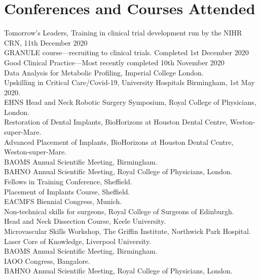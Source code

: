 \section*{Conferences and Courses Attended}

 Tomorrow's Leaders, Training in clinical trial development run by the NIHR CRN, 11th December 2020 \\ 
 GRANULE course---recruiting to clinical trials. Completed 1st December 2020 \\
 Good Clinical Practice---Most recently completed 10th November 2020 \\
 Data Analysis for Metabolic Profiling, Imperial College London. \\
 Upskilling in Critical Care/Covid-19, University Hospitals Birmingham, 1st May 2020. \\
 EHNS Head and Neck Robotic Surgery Symposium, Royal College of Physicians, London. \\
 Restoration of Dental Implants, BioHorizons at Houston Dental Centre,  Weston-super-Mare. \\
 Advanced Placement of Implants, BioHorizons at Houston Dental Centre,  Weston-super-Mare. \\
 BAOMS Annual Scientific Meeting, Birmingham. \\
 BAHNO Annual Scientific Meeting, Royal College of Physicians, London. \\
 Fellows in Training Conference,  Sheffield. \\
 Placement of Implants Course, Sheffield. \\
 EACMFS Biennial Congress, Munich. \\
 Non-technical skills for surgeons, Royal College of Surgeons of Edinburgh. \\
 Head and Neck Dissection Course, Keele University. \\
 Microvascular Skills Workshop, The Griffin Institute, Northwick Park Hospital. \\
 Laser Core of Knowledge, Liverpool University. \\
 BAOMS Annual Scientific Meeting, Birmingham. \\
 IAOO Congress, Bangalore. \\
 BAHNO Annual Scientific Meeting, Royal College of Physicians, London. \\
